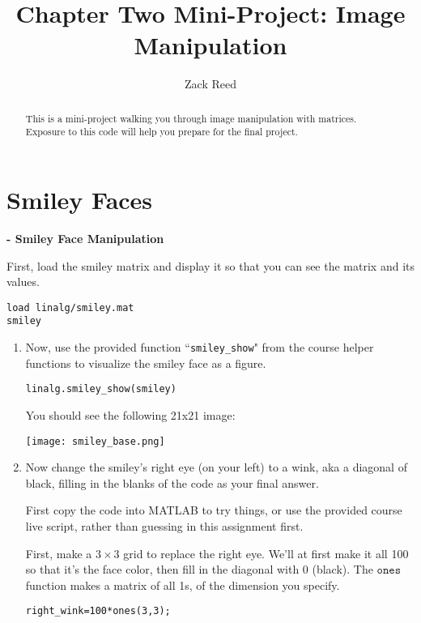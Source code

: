 \documentclass{ximera}
\author{Zack Reed}
\title{Chapter Two Mini-Project: Image Manipulation}
\begin{document}
\begin{abstract}

    This is a mini-project walking you through image manipulation with matrices. Exposure to this code will help you prepare for the final project.

\end{abstract}
\maketitle


\section*{Smiley Faces}

\begin{problem}
{\bf - Smiley Face Manipulation}

First, load the smiley matrix and display it so that you can see the matrix and its values.
\begin{verbatim}
load linalg/smiley.mat
smiley
\end{verbatim}

\begin{enumerate}

\item Now, use the provided function ``\texttt{smiley\_show}" from the course helper functions to visualize the smiley face as a figure.

\begin{verbatim}
linalg.smiley_show(smiley)
\end{verbatim}

You should see the following 21x21 image:
\begin{center}
\texttt{[image: smiley\_base.png]}
\end{center}

\item Now change the smiley's right eye (on your left) to a wink, aka a diagonal of black, filling in the blanks of the code as your final answer.
\begin{hint}
First copy the code into MATLAB to try things, or use the provided course live script, rather than guessing in this assignment first.
\end{hint}

First, make a $3\times 3$ grid to replace the right eye. We'll at first make it all 100 so that it's the face color, then fill in the diagonal with 0 (black). The $\texttt{ones}$ function makes a matrix of all 1s, of the dimension you specify.
\begin{verbatim}
right_wink=100*ones(3,3);
\end{verbatim}


\end{enumerate}
\end{problem}
\end{document}
